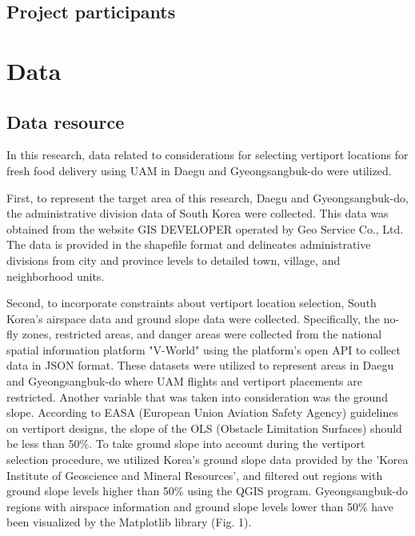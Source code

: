 \documentclass[11pt]{article}
\begin{document}
    \subsection{Project participants}                       

       

    \section{Data}
    \subsection{Data resource}
    
    In this research, data related to considerations for selecting vertiport locations for fresh food delivery using UAM in Daegu and Gyeongsangbuk-do were utilized.\
    
    First, to represent the target area of this research, Daegu and Gyeongsangbuk-do, the administrative division data of South Korea were collected. This data was obtained from the website GIS DEVELOPER operated by Geo Service Co., Ltd. The data is provided in the shapefile format and delineates administrative divisions from city and province levels to detailed town, village, and neighborhood units.\
    
    Second, to incorporate constraints about vertiport location selection, South Korea's airspace data and ground slope data were collected. Specifically, the no-fly zones, restricted areas, and danger areas were collected from the national spatial information platform "V-World" using the platform's open API to collect data in JSON format. These datasets were utilized to represent areas in Daegu and Gyeongsangbuk-do where UAM flights and vertiport placements are restricted. Another variable that was taken into consideration was the ground slope. According to EASA (European Union Aviation Safety Agency) \citep{unknown-author-2022} guidelines on vertiport designs, the slope of the OLS (Obstacle Limitation Surfaces) should be less than 50\%. To take ground slope into account during the vertiport selection procedure, we utilized Korea's ground slope data provided by the 'Korea Institute of Geoscience and Mineral Resources', and filtered out regions with ground slope levels higher than 50\% using the QGIS program. Gyeongsangbuk-do regions with airspace information and ground slope levels lower than 50\% have been visualized by the Matplotlib library (Fig. 1).
    
\end{document}

